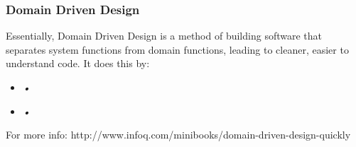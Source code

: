 \documentclass[t, 10pt]{beamer}
\begin{document}
\begin{frame}
\frametitle{Domain Driven Design}
Essentially, Domain Driven Design is a method of building software that separates system functions from domain functions, leading to cleaner, easier to understand code.  It does this by:
\begin{itemize}
\item \textit{•}
\item \textit{•}
\end{itemize}

For more info: http://www.infoq.com/minibooks/domain-driven-design-quickly
\end{frame}

\begin{frame}
\frametitle{}
\end{frame}
\end{document}
